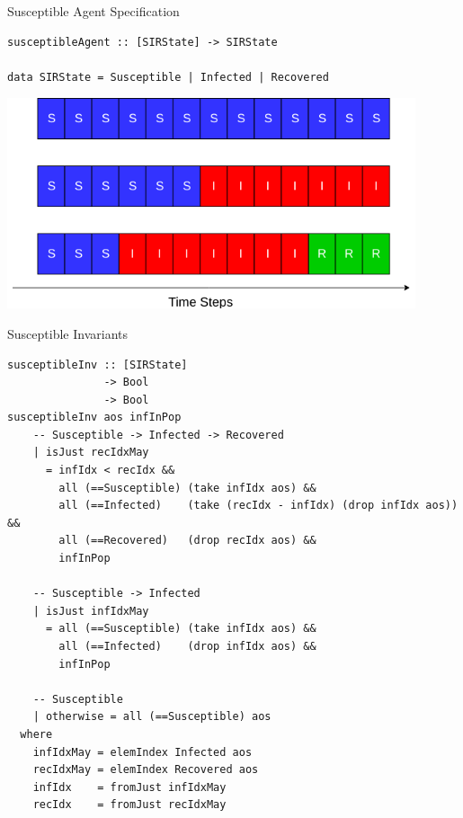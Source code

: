 \documentclass{beamer} %
\begin{document}
\begin{frame}[fragile]{Susceptible Agent Specification}
\begin{block}{}
\begin{verbatim}
susceptibleAgent :: [SIRState] -> SIRState

data SIRState = Susceptible | Infected | Recovered
\end{verbatim}
\end{block}

\begin{center}
\includegraphics[width=0.9\textwidth]{./fig/property_susceptible_output.png}
\end{center}
\end{frame}

\begin{frame}[fragile]{Susceptible Invariants}
\begin{verbatim}
susceptibleInv :: [SIRState] 
               -> Bool
               -> Bool
susceptibleInv aos infInPop
    -- Susceptible -> Infected -> Recovered
    | isJust recIdxMay 
      = infIdx < recIdx &&  
        all (==Susceptible) (take infIdx aos) && 
        all (==Infected)    (take (recIdx - infIdx) (drop infIdx aos)) && 
        all (==Recovered)   (drop recIdx aos) &&
        infInPop 

    -- Susceptible -> Infected
    | isJust infIdxMay 
      = all (==Susceptible) (take infIdx aos) &&
        all (==Infected)    (drop infIdx aos) &&
        infInPop

    -- Susceptible 
    | otherwise = all (==Susceptible) aos
  where
    infIdxMay = elemIndex Infected aos
    recIdxMay = elemIndex Recovered aos
    infIdx    = fromJust infIdxMay
    recIdx    = fromJust recIdxMay
\end{verbatim}
\end{frame}
\end{document}
